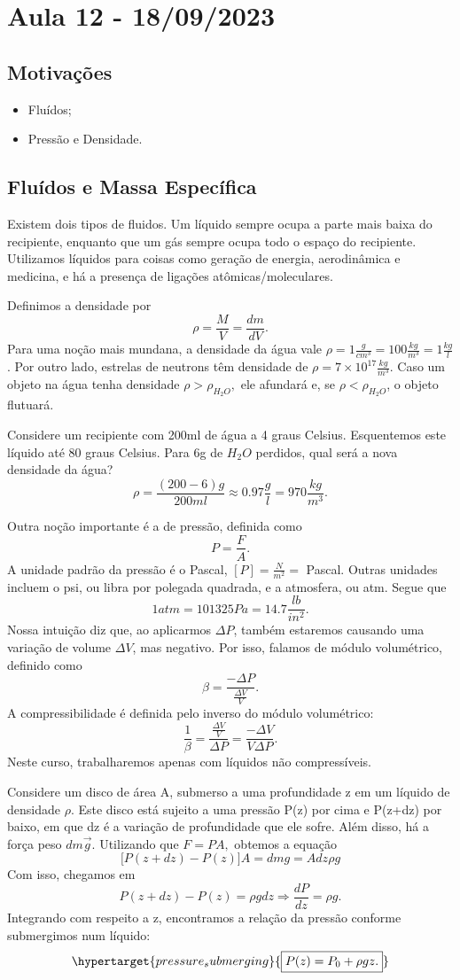 \documentclass[physicsII_notes.tex]{subfiles}
\begin{document}
\section{Aula 12 - 18/09/2023}
\subsection{Motivações}
\begin{itemize}
	\item Fluídos;
	\item Pressão e Densidade.
\end{itemize}
\subsection{Fluídos e Massa Específica}
Existem dois tipos de fluidos. Um líquido sempre ocupa a parte mais baixa do recipiente, enquanto que um gás
sempre ocupa todo o espaço do recipiente. Utilizamos líquidos para coisas como geração de energia, aerodinâmica e medicina,
e há a presença de ligações atômicas/moleculares.

Definimos a densidade por
\[
	\rho = \frac{M}{V} = \frac{dm}{dV}.
\]
Para uma noção mais mundana, a densidade da água vale \(\rho = 1 \frac{g}{cm^{3}} = 100 \frac{kg}{m^{3}} = 1 \frac{kg}{l}\). Por outro lado, estrelas de neutrons
têm densidade de \(\rho = 7\times 10^{17}\frac{kg}{m^{3}}\). Caso um objeto na água tenha densidade \(\rho > \rho_{H_{2}O},\) ele afundará e, se
\(\rho < \rho_{H_{2}O}\), o objeto flutuará.
\begin{example}
	Considere um recipiente com 200ml de água a 4 graus Celsius. Esquentemos este líquido até 80 graus Celsius.
	Para 6g de \(H_{2}O\) perdidos, qual será a nova densidade da água?
	\[
		\rho = \frac{(200 - 6)g}{200ml}\approx 0.97 \frac{g}{l} = 970 \frac{kg}{m^{3}}.
	\]
\end{example}
Outra noção importante é a de pressão, definida como
\[
	P = \frac{F}{A}.
\]
A unidade padrão da pressão é o Pascal, \([P]= \frac{N}{m^{2}} =\) Pascal. Outras unidades incluem o psi,
ou libra por polegada quadrada, e a atmosfera, ou atm. Segue que
\[
	1atm = 101325 Pa = 14.7 \frac{lb}{in^{2}}.
\]
Nossa intuição diz que, ao aplicarmos \(\Delta P\), também estaremos causando uma variação de volume \(\Delta V\), mas negativo.
Por isso, falamos de módulo volumétrico, definido como
\[
	\beta = \frac{-\Delta P}{\frac{\Delta V}{V}}.
\]
A compressibilidade é definida pelo inverso do módulo volumétrico:
\[
	\frac{1}{\beta } = \frac{\frac{\Delta V}{V}}{\Delta P} = \frac{-\Delta V}{V\Delta P}.
\]
Neste curso, trabalharemos apenas com líquidos não compressíveis.

Considere um disco de área A, submerso a uma profundidade z em um líquido de densidade \(\rho \).
Este disco está sujeito a uma pressão P(z) por cima e P(z+dz) por baixo, em que dz é a variação de profundidade que ele sofre.
Além disso, há a força peso \(dm \vec{g}\). Utilizando que \(F = P A,\) obtemos a equação
\[
	\biggl[P(z+dz) - P(z)\biggr]A = dmg = Adz\rho g
\]
Com isso, chegamos em
\[
	P(z+dz) - P(z) = \rho g dz \Rightarrow \frac{dP}{dz} = \rho g.
\]
Integrando com respeito a z, encontramos a relação da pressão conforme submergimos num líquido:
\[
	\hypertarget{pressure_submerging}{\boxed{P(z) = P_{0}+\rho gz.}}
\]
\end{document}

